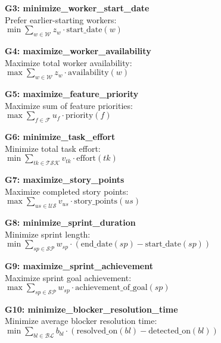 \documentclass[12pt]{article}
\begin{document}
    \item \textbf{G3: minimize\_worker\_start\_date} \\
    Prefer earlier-starting workers: \\
    $ \min \sum_{w \in \mathcal{W}} z_w \cdot \text{start\_date}(w) $

    \item \textbf{G4: maximize\_worker\_availability} \\
    Maximize total worker availability: \\
    $ \max \sum_{w \in \mathcal{W}} z_w \cdot \text{availability}(w) $

    \item \textbf{G5: maximize\_feature\_priority} \\
    Maximize sum of feature priorities: \\
    $ \max \sum_{f \in \mathcal{F}} u_f \cdot \text{priority}(f) $

    \item \textbf{G6: minimize\_task\_effort} \\
    Minimize total task effort: \\
    $ \min \sum_{tk \in \mathcal{TSK}} v_{tk} \cdot \text{effort}(tk) $

    \item \textbf{G7: maximize\_story\_points} \\
    Maximize completed story points: \\
    $ \max \sum_{us \in \mathcal{US}} v_{us} \cdot \text{story\_points}(us) $

    \item \textbf{G8: minimize\_sprint\_duration} \\
    Minimize sprint length: \\
    $ \min \sum_{sp \in \mathcal{SP}} w_{sp} \cdot (\text{end\_date}(sp) - \text{start\_date}(sp)) $

    \item \textbf{G9: maximize\_sprint\_achievement} \\
    Maximize sprint goal achievement: \\
    $ \max \sum_{sp \in \mathcal{SP}} w_{sp} \cdot \text{achievement\_of\_goal}(sp) $

    \item \textbf{G10: minimize\_blocker\_resolution\_time} \\
    Minimize average blocker resolution time: \\
    $ \min \sum_{bl \in \mathcal{BL}} b_{bl} \cdot (\text{resolved\_on}(bl) - \text{detected\_on}(bl)) $
\end{document}
